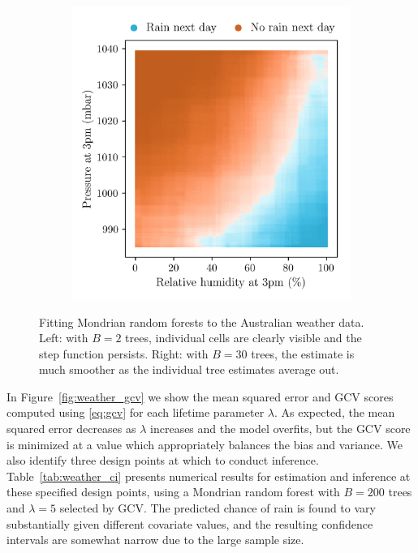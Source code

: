 \begin{figure}[ht]
\begin{subfigure}{0.49\textwidth}
    \includegraphics[scale=0.64]{graphics/weather_forest_30.png}%
  \end{subfigure}
  \caption{Fitting Mondrian random forests to the Australian weather data.
    Left: with $B=2$ trees, individual cells are clearly visible and the step
    function persists. Right: with $B=30$ trees, the estimate is much smoother
  as the individual tree estimates average out.}
  \label{fig:weather_forest}
\end{figure}

In Figure~\ref{fig:weather_gcv} we show the mean squared error
and GCV scores computed using \eqref{eq:gcv} for
each lifetime parameter $\lambda$. As expected, the mean squared error
decreases as $\lambda$ increases and the model overfits, but the GCV score 
is minimized
at a value which appropriately balances the bias and variance. We also
identify three design points at which to conduct inference.
Table~\ref{tab:weather_ci} presents numerical results for estimation and
inference at these specified design points, using a Mondrian random forest
with $B=200$ trees and $\lambda = 5$ selected by GCV.
The predicted chance of rain
is found to vary substantially given different covariate values,
and the resulting confidence intervals are somewhat narrow due to the
large sample size.

